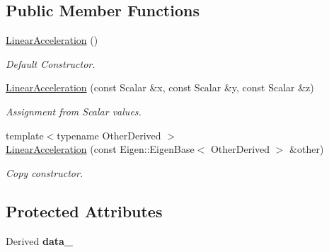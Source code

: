 \subsection*{Public Member Functions}
\begin{DoxyCompactItemize}
\item 
\hyperlink{classow__core_1_1LinearAcceleration_a6761e3ab1a7bd77c15cb0759dd25b1e1}{Linear\+Acceleration} ()\hypertarget{classow__core_1_1LinearAcceleration_a6761e3ab1a7bd77c15cb0759dd25b1e1}{}\label{classow__core_1_1LinearAcceleration_a6761e3ab1a7bd77c15cb0759dd25b1e1}

\begin{DoxyCompactList}\small\item\em Default Constructor. \end{DoxyCompactList}\item 
\hyperlink{classow__core_1_1LinearAcceleration_ae2ac66af1c81554f31535fd7af7aa2b4}{Linear\+Acceleration} (const Scalar \&x, const Scalar \&y, const Scalar \&z)\hypertarget{classow__core_1_1LinearAcceleration_ae2ac66af1c81554f31535fd7af7aa2b4}{}\label{classow__core_1_1LinearAcceleration_ae2ac66af1c81554f31535fd7af7aa2b4}

\begin{DoxyCompactList}\small\item\em Assignment from Scalar values. \end{DoxyCompactList}\item 
{\footnotesize template$<$typename Other\+Derived $>$ }\\\hyperlink{classow__core_1_1LinearAcceleration_a243335c29a665db0eb2870fa7d41f5eb}{Linear\+Acceleration} (const Eigen\+::\+Eigen\+Base$<$ Other\+Derived $>$ \&other)
\begin{DoxyCompactList}\small\item\em Copy constructor. \end{DoxyCompactList}\end{DoxyCompactItemize}
\subsection*{Protected Attributes}
\begin{DoxyCompactItemize}
\item 
Derived {\bfseries data\+\_\+}\hypertarget{classow__core_1_1LinearAcceleration_aaf5e7a060e1ed0ac2f3545ba4485fe36}{}\label{classow__core_1_1LinearAcceleration_aaf5e7a060e1ed0ac2f3545ba4485fe36}

\end{DoxyCompactItemize}


